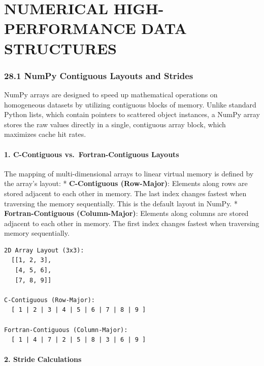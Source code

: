 \hypertarget{numerical-high-performance-data-structures}{%
\chapter{NUMERICAL HIGH-PERFORMANCE DATA
STRUCTURES}\label{numerical-high-performance-data-structures}}

\hypertarget{numpy-contiguous-layouts-and-strides}{%
\subsection{28.1 NumPy Contiguous Layouts and
Strides}\label{numpy-contiguous-layouts-and-strides}}

NumPy arrays are designed to speed up mathematical operations on
homogeneous datasets by utilizing contiguous blocks of memory. Unlike
standard Python lists, which contain pointers to scattered object
instances, a NumPy array stores the raw values directly in a single,
contiguous array block, which maximizes cache hit rates.

\hypertarget{c-contiguous-vs.-fortran-contiguous-layouts}{%
\subsubsection{1. C-Contiguous vs.~Fortran-Contiguous
Layouts}\label{c-contiguous-vs.-fortran-contiguous-layouts}}

The mapping of multi-dimensional arrays to linear virtual memory is
defined by the array's layout: * \textbf{C-Contiguous (Row-Major)}:
Elements along rows are stored adjacent to each other in memory. The
last index changes fastest when traversing the memory sequentially. This
is the default layout in NumPy. * \textbf{Fortran-Contiguous
(Column-Major)}: Elements along columns are stored adjacent to each
other in memory. The first index changes fastest when traversing memory
sequentially.

\begin{lstlisting}
2D Array Layout (3x3):
  [[1, 2, 3],
   [4, 5, 6],
   [7, 8, 9]]

C-Contiguous (Row-Major):
  [ 1 | 2 | 3 | 4 | 5 | 6 | 7 | 8 | 9 ]

Fortran-Contiguous (Column-Major):
  [ 1 | 4 | 7 | 2 | 5 | 8 | 3 | 6 | 9 ]
\end{lstlisting}

\hypertarget{stride-calculations}{%
\subsubsection{2. Stride Calculations}\label{stride-calculations}}

